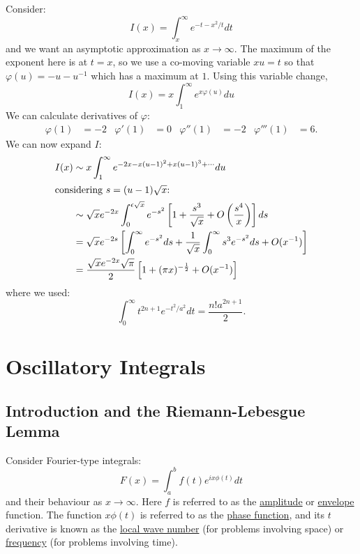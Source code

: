 \documentclass[../Main.tex]{subfiles}
\begin{document}
\begin{example}
    Consider:
    \begin{equation*}
        I(x) = \int_{x}^{\infty} e^{-t-x^2 / t} dt 
    \end{equation*}
    and we want an asymptotic approximation as $x \to \infty$. The maximum of the exponent here is at $t = x$, so we use a co-moving variable $xu = t$ so that $\varphi(u) = -u-u^{-1}$ which has a maximum at $1$. Using this variable change, 
    \begin{equation*}
        I(x) = x \int_{1}^{\infty} e^{x\varphi(u)} du 
    \end{equation*}
    We can calculate derivatives of $\varphi$:
    \begin{align*}
        \varphi(1) &= -2 & \varphi'(1) &= 0 & \varphi''(1) &= -2 & \varphi'''(1) &= 6.
    \end{align*}
    We can now expand $I$:
    \begin{align*}
        I(x) &\sim x \int_{1}^{\infty} e^{-2x-x(u-1)^2 + x(u-1)^3 + \cdots} du \\
    \intertext{considering $s = (u-1)\sqrt{x}$:}
        &\sim \sqrt{x} e^{-2x} \int_{0}^{\epsilon \sqrt{x}} e^{-s^2} \left[1 + \frac{s^3}{\sqrt{x}} + O\left(\frac{s^4}{x}\right)\right] ds \\
        &= \sqrt{x} e^{-2s} \left[\int_{0}^{\infty} e^{-s^2} ds + \frac1{\sqrt{x}} \int_{0}^{\infty} s^3 e^{-s^2} ds + O(x^{-1})\right] \\
        &= \frac{\sqrt{x}e^{-2x}\sqrt{\pi}}{2} \left[1 + (\pi x)^{-\frac12} + O(x^{-1})\right]
    \end{align*}
    where we used:
    \begin{equation*}
        \int_{0}^{\infty} t^{2n+1} e^{-t^2 / a^2} dt = \frac{n!a^{2n+1}}{2}.
    \end{equation*}
\end{example}
\section{Oscillatory Integrals}
\subsection{Introduction and the Riemann-Lebesgue Lemma}
Consider Fourier-type integrals:
\begin{equation*}
    F(x) = \int_{a}^{b} f(t)e^{ix\phi(t)} dt
\end{equation*}
and their behaviour as $x \to \infty$. Here $f$ is referred to as the \underline{amplitude} or \underline{envelope} function. The function $x\phi(t)$ is referred to as the \underline{phase function}, and its $t$ derivative is known as the \underline{local wave number} (for problems involving space) or \underline{frequency} (for problems involving time).
\end{document}
